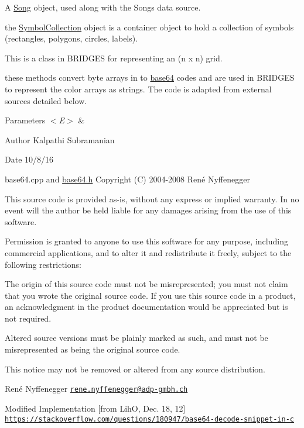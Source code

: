 A \mbox{\hyperlink{classbridges_1_1_song}{Song}} object, used along with the Songs data source.

the \mbox{\hyperlink{classbridges_1_1_symbol_collection}{Symbol\+Collection}} object is a container object to hold a collection of symbols (rectangles, polygons, circles, labels).

This is a class in B\+R\+I\+D\+G\+ES for representing an (n x n) grid.

these methods convert byte arrays in to \mbox{\hyperlink{namespacebridges_1_1base64}{base64}} codes and are used in B\+R\+I\+D\+G\+ES to represent the color arrays as strings. The code is adapted from external sources detailed below.


\begin{DoxyParams}{Parameters}
{\em $<$\+E$>$} & \\
\hline
\end{DoxyParams}
\begin{DoxyAuthor}{Author}
Kalpathi Subramanian 
\end{DoxyAuthor}
\begin{DoxyDate}{Date}
10/8/16
\end{DoxyDate}
base64.\+cpp and \mbox{\hyperlink{base64_8h}{base64.\+h}} Copyright (C) 2004-\/2008 René Nyffenegger

This source code is provided \textquotesingle{}as-\/is\textquotesingle{}, without any express or implied warranty. In no event will the author be held liable for any damages arising from the use of this software.

Permission is granted to anyone to use this software for any purpose, including commercial applications, and to alter it and redistribute it freely, subject to the following restrictions\+:


\begin{DoxyEnumerate}
\item The origin of this source code must not be misrepresented; you must not claim that you wrote the original source code. If you use this source code in a product, an acknowledgment in the product documentation would be appreciated but is not required.
\begin{DoxyEnumerate}
\item Altered source versions must be plainly marked as such, and must not be misrepresented as being the original source code.
\item This notice may not be removed or altered from any source distribution.
\end{DoxyEnumerate}

René Nyffenegger \href{mailto:rene.nyffenegger@adp-gmbh.ch}{\tt rene.\+nyffenegger@adp-\/gmbh.\+ch}

Modified Implementation \mbox{[}from LihO, Dec. 18, 12\mbox{]} \href{https://stackoverflow.com/questions/180947/base64-decode-snippet-in-c}{\tt https\+://stackoverflow.\+com/questions/180947/base64-\/decode-\/snippet-\/in-\/c}
\end{DoxyEnumerate}

